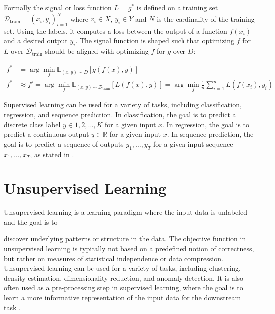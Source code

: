 Formally the signal or loss function $L = g^*$ is defined on a training set $\mathcal{D}_{\text{train}} = {(x_i,y_i)}_{i=1}^N$ where $x_i \in X$, $y_i \in Y$ and $N$ is the 
cardinality of the training set. Using the 
labels, it computes a loss between the output of a function $f(x_i)$ and a desired output $y_i$. The signal function is shaped such that optimizing $f$ for $L$ 
over $\mathcal{D}_{\text{train}}$ should be aligned with optimizing $f$ for $g$ over $D$:

\begin{equation}
\begin{aligned}
f^* &= \arg\min_{f} \mathbb{E}_{(x,y) \sim D}[g(f(x), y)] \\
f^* &\approx f' = \arg\min_{f} \mathbb{E}_{(x,y) \sim \mathcal{D}_{\text{train}}}[L(f(x),y)] = \arg\min_{f} \frac{1}{n}\sum_{i=1}^n L(f(x_i),y_i)
\end{aligned}
\end{equation}


Supervised learning can be used for a variety of tasks, including classification, regression, and sequence prediction. In classification, 
the goal is to predict a discrete class label $y \in {1,2,\ldots,K}$ for a given input $x$. In regression, the goal is to predict a continuous 
output $y \in \mathbb{R}$ for a given input $x$. In sequence prediction, the goal is to predict a sequence of outputs $y_1,\ldots,y_T$ for a 
given input sequence $x_1,\ldots,x_T$, as stated in \cite[chapter~4]{bishop} \cite[chapter~5, chapter~6]{Goodfellow}.

\section{Unsupervised Learning}
\label{section:unsup_learn}
Unsupervised learning is a learning paradigm where the input data is unlabeled and the goal is to 

discover underlying patterns or structure in the data.
The objective function in unsupervised learning is typically not based on a predefined notion of correctness, but
rather on measures of statistical
independence or data compression.\\

Unsupervised learning can be used for a variety of tasks, including clustering, density estimation, dimensionality 
reduction, and anomaly detection.
It is also often used as a pre-processing step in supervised learning, where the goal is to learn a more informative 
representation of the input data 
for the downstream task \cite[chapter~9]{bishop} \cite[chapter~5]{Goodfellow}. 

